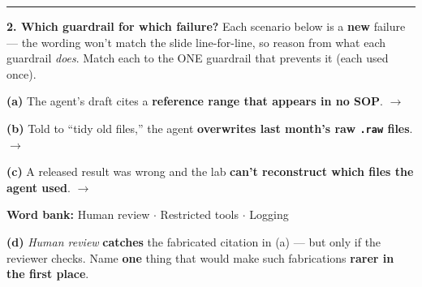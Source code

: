 \documentclass[11pt]{article}
\newif\ifsolution
\newcommand{\blk}[1]{\underline{\hspace{#1}}}
\newcommand{\rb}[2]{\ifsolution\textbf{#1}\else\blk{#2}\fi}
\newcommand{\keybox}[1]{\ifsolution\par\vspace{2pt}%
  \fbox{\parbox{0.965\textwidth}{\small\textbf{Answer.}\; #1}}\par\fi}
\newcommand{\work}[1]{\ifsolution\else\vspace{#1}\fi}
\begin{document}
\vspace{2pt}\hrule\vspace{5pt}

\textbf{2. Which guardrail for which failure?}\; {\small Each scenario below is a \textbf{new} failure ---
the wording won't match the slide line-for-line, so reason from what each guardrail \emph{does}. Match each
to the ONE guardrail that prevents it (each used once).}

\vspace{4pt}
\textbf{(a)} The agent's draft cites a \textbf{reference range that appears in no SOP}.
\hfill $\rightarrow$\;\rb{Human review}{4.6cm}

\vspace{3pt}
\textbf{(b)} Told to ``tidy old files,'' the agent \textbf{overwrites last month's raw \texttt{.raw} files}.
\hfill $\rightarrow$\;\rb{Restricted tools}{4.6cm}

\vspace{3pt}
\textbf{(c)} A released result was wrong and the lab \textbf{can't reconstruct which files the agent used}.
\hfill $\rightarrow$\;\rb{Logging}{4.6cm}

\vspace{4pt}
\begin{center}
{\small \textbf{Word bank:}\;\; Human review \;$\cdot$\; Restricted tools \;$\cdot$\; Logging}
\end{center}

\vspace{2pt}
\textbf{(d)} \emph{Human review} \textbf{catches} the fabricated citation in (a) --- but only if the
reviewer checks. Name \textbf{one} thing that would make such fabrications \textbf{rarer in the first
place}.

\work{0.9cm}
\ifsolution\else\blk{\linewidth}\fi

\keybox{(a) \textbf{Human review} --- a person verifies every number/citation against a source before
release. (b) \textbf{Restricted tools} --- read-only access, no write/delete/purchase without approval, so
it \emph{cannot} take a destructive action (the disguised version of ``deletes raw data''). (c)
\textbf{Logging} --- every reason$\rightarrow$act step recorded, so the run is auditable and reproducible.
Each used once. \textbf{(d)} Human review is a \emph{catch-after} control; to make fabrications rarer
\emph{up front}, \textbf{ground the agent in real retrieved sources (RAG)} and/or \textbf{restrict it to a
vetted reference database} so it can only cite documents that actually exist --- prevention layered on top
of detection.}
\end{document}
